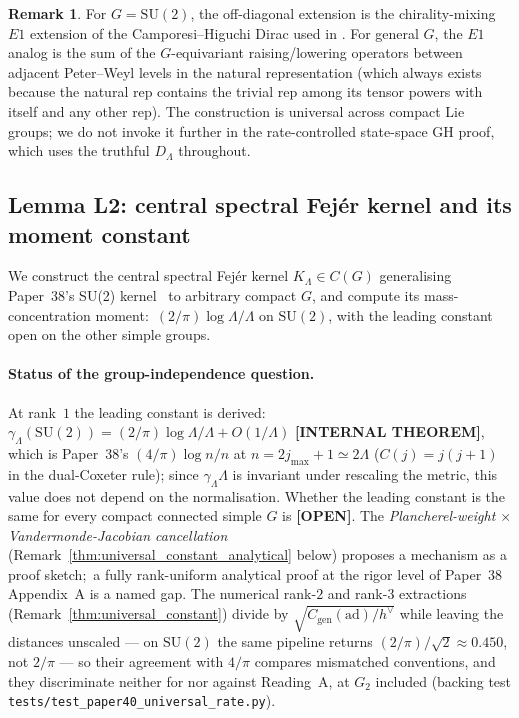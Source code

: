 \documentclass[11pt,a4paper]{article}
\theoremstyle{plain}
\theoremstyle{definition}
\newtheorem{remark}[theorem]{Remark}
\newcommand{\Lammax}{\Lambda}
\newcommand{\SU}{\mathrm{SU}}
\newcommand{\Cas}{C}
\newcommand{\Dop}{D}
\newcommand{\KS}{K}
\begin{document}
\begin{remark}\label{rem:offdiag_general}
For $G = \SU(2)$, the off-diagonal extension is the chirality-mixing
$E1$ extension of the Camporesi--Higuchi Dirac used in
\cite[Lemma 3.1]{paper38}. For general $G$, the $E1$ analog is the
sum of the $G$-equivariant raising/lowering operators between adjacent
Peter--Weyl levels in the natural representation (which always exists
because the natural rep contains the trivial rep among its tensor
powers with itself and any other rep). The construction is
universal across compact Lie groups; we do not invoke it further in
the rate-controlled state-space GH proof, which uses the truthful
$\Dop_\Lammax$ throughout.
\end{remark}

\subsection{Lemma L2: central spectral Fej\'er kernel and its moment
constant}\label{sec:L2}

We construct the central spectral Fej\'er kernel
$\KS_\Lammax \in C(G)$ generalising Paper~38's SU(2)
kernel~\cite[Def.~2.1]{paper38} to arbitrary compact $G$, and compute
its mass-concentration moment:\ $(2/\pi)\log \Lammax/\Lammax$ on
$\SU(2)$, with the leading constant open on the other simple groups.

\paragraph{Status of the group-independence question.} At rank~$1$ the leading
constant is derived:\ $\gamma_\Lammax(\SU(2)) = (2/\pi)\log\Lammax/\Lammax
+ O(1/\Lammax)$ \textbf{[INTERNAL THEOREM]}, which is Paper~38's
$(4/\pi)\log n/n$ at $n = 2j_{\max} + 1 \simeq 2\Lammax$ ($\Cas(j) =
j(j+1)$ in the dual-Coxeter rule); since $\gamma_\Lammax\Lammax$ is
invariant under rescaling the metric, this value does not depend on the
normalisation. Whether the leading constant is the same for every
compact connected simple $G$ is \textbf{[OPEN]}. The
\emph{Plancherel-weight $\times$ Vandermonde-Jacobian cancellation}
(Remark~\ref{thm:universal_constant_analytical} below) proposes a
mechanism as a proof sketch;\ a fully rank-uniform analytical proof at
the rigor level of Paper~38 Appendix~A is a named gap. The numerical
rank-$2$ and rank-$3$ extractions (Remark~\ref{thm:universal_constant})
divide by $\sqrt{C_{\mathrm{gen}}(\mathrm{ad})/h^\vee}$ while leaving the
distances unscaled --- on $\SU(2)$ the same pipeline returns
$(2/\pi)/\sqrt2 \approx 0.450$, not $2/\pi$ --- so their agreement with
$4/\pi$ compares mismatched conventions, and they discriminate neither
for nor against Reading~A, at $G_2$ included (backing test
\texttt{tests/test\_paper40\_universal\_rate.py}).
\end{document}
